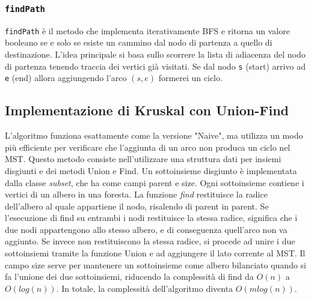 \subsubsection{\texttt{findPath}}
\texttt{findPath} è il metodo che implementa iterativamente BFS e ritorna un valore booleano se e solo se esiste un cammino dal nodo di partenza a quello di destinazione. L'idea principale si basa sullo scorrere la lista di adiacenza del nodo di partenza tenendo traccia dei vertici già visitati. Se dal nodo \texttt{s} (start) arrivo ad \texttt{e} (end) allora aggiungendo l'arco $(s, e)$ formerei un ciclo.
\subsection{Implementazione di Kruskal con Union-Find}
L'algoritmo funziona esattamente come la versione "Naive", ma utilizza un modo più efficiente per verificare
che l'aggiunta di un arco non produca un ciclo nel MST. Questo metodo consiste nell'utilizzare una struttura dati per insiemi disgiunti e dei metodi Union e Find. Un sottoinsieme disgiunto è implementata dalla classe \textit{subset}, che
ha come campi parent e size. Ogni sottoinsieme contiene i vertici di un albero in una foresta. La funzione \textit{find} restituisce la radice dell'albero al quale appartiene il nodo, risalendo di parent in parent. Se l'esecuzione di find su entrambi i nodi restituisce la stessa radice,
significa che i due nodi appartengono  allo stesso albero, e di conseguenza quell'arco non va aggiunto. Se invece non restituiscono la stessa radice, si procede ad unire i due sottoinsiemi tramite la funzione Union
e ad aggiungere il lato corrente al MST. Il campo size serve per mantenere un sottoinsieme come albero bilanciato quando si fa l'unione dei due sottoinsiemi, riducendo la complessità di find da $O(n)$ a $O(log(n))$. In totale, la complessità dell'algoritmo diventa $O(m log(n))$.